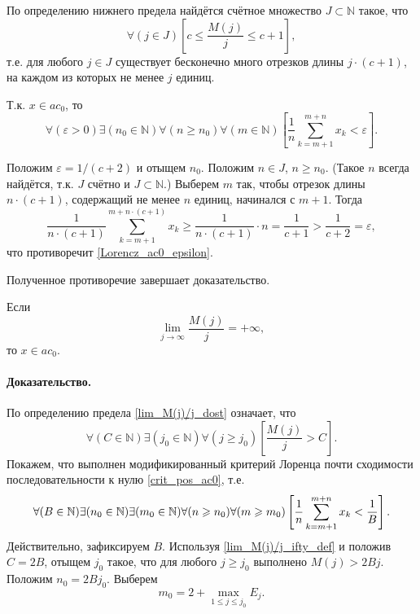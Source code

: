 По определению нижнего предела найдётся счётное множество
$J\subset\mathbb{N}$ такое, что
\begin{equation}
	\forall(j\in J)\left[c \leq \frac{M(j)}{j} \leq c+1 \right],
\end{equation}
т.е. для любого $j\in J$ существует бесконечно много отрезков длины $j\cdot(c+1)$,
на каждом из которых не менее $j$ единиц.

Т.к. $x\in ac_0$, то
\begin{equation}\label{Lorencz_ac0_epsilon}
	\forall(\varepsilon>0)
	\exists(n_0\in\mathbb{N})
	\forall(n \geq n_0)
	\forall(m\in\mathbb{N})
	\left[
		\frac{1}{n} \sum_{k=m+1}^{m+n}x_k < \varepsilon
	\right]
	.
\end{equation}

Положим $\varepsilon = 1/(c+2)$ и отыщем $n_0$.
Положим $n\in J$, $n\geq n_0$.
(Такое $n$ всегда найдётся, т.к. $J$ счётно и $J\subset\mathbb{N}$.)
Выберем $m$ так, чтобы отрезок длины $n\cdot(c+1)$,
содержащий не менее $n$ единиц,
начинался с $m+1$.
Тогда
\begin{equation}
	\frac{1}{n\cdot(c+1)}\sum_{k=m+1}^{m+n\cdot(c+1)}x_k
	\geq
	\frac{1}{n\cdot(c+1)} \cdot n
	=
	\frac{1}{c+1}
	>
	\frac{1}{c+2}
	=
	\varepsilon,
\end{equation}
что противоречит \eqref{Lorencz_ac0_epsilon}.

Полученное противоречие завершает доказательство.


\begin{lemma}
	\label{thm:lim_M(j)/j_dost}
	Если
	\begin{equation}\label{lim_M(j)/j_dost}
		\lim_{j \to \infty} \frac{M(j)}{j} = +\infty
		,
	\end{equation}
	то $x \in ac_0$.
\end{lemma}

\paragraph{Доказательство.}

По определению предела \eqref{lim_M(j)/j_dost} означает, что
\begin{equation}\label{lim_M(j)/j_ifty_def}
	\forall(C  \in\mathbb{N})
	\exists(j_0\in\mathbb{N})
	\forall(j \geq j_0)
	\left[
		\frac{M(j)}{j}>C
	\right]
	.
\end{equation}
Покажем, что выполнен модификированный критерий Лоренца почти сходимости последовательности к нулю
\eqref{crit_pos_ac0}, т.е.
\begin{equation}
	\forall(B  \in\mathbb{N})
	\exists(n_0\in\mathbb{N})
	\exists(m_0\in\mathbb{N})
	\forall(n\geq n_0)
	\forall(m\geq m_0)
	\\
	\left[
		\frac{1}{n}
		\sum_{k=m+1}^{m+n} x_k
		<
		\frac{1}{B}
	\right]
	.
\end{equation} Действительно, зафиксируем $B$.
Используя \eqref{lim_M(j)/j_ifty_def} и положив $C=2B$,
отыщем $j_0$ такое, что для любого $j\geq j_0$ выполнено
$M(j)>2Bj$.
Положим $n_0 = 2Bj_0$.
Выберем
$$
	m_0 = 2+\max_{1\leq j \leq j_0} E_j
	.
$$

